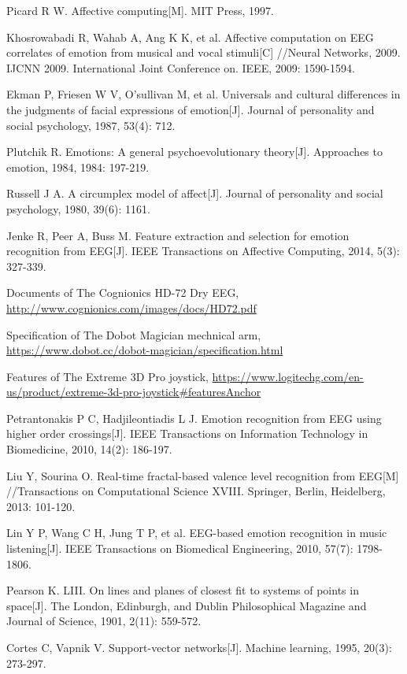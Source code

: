 \documentclass[runningheads,a4paper]{llncs}
\begin{document}
\begin{thebibliography}{4}

 Picard R W.
  Affective computing[M].
   MIT Press, 1997.

 Khosrowabadi R, Wahab A, Ang K K, et al.
Affective computation on EEG correlates of emotion from musical and vocal stimuli[C]
//Neural Networks, 2009. IJCNN 2009. International Joint Conference on. IEEE, 2009: 1590-1594.

 Ekman P, Friesen W V, O'sullivan M, et al.
Universals and cultural differences in the judgments of facial expressions of emotion[J].
Journal of personality and social psychology, 1987, 53(4): 712.

 Plutchik R.
Emotions: A general psychoevolutionary theory[J].
Approaches to emotion, 1984, 1984: 197-219.

 Russell J A.
A circumplex model of affect[J].
Journal of personality and social psychology, 1980, 39(6): 1161.

 Jenke R, Peer A, Buss M.
Feature extraction and selection for emotion recognition from EEG[J].
IEEE Transactions on Affective Computing, 2014, 5(3): 327-339.

 Documents of The Cognionics HD-72 Dry EEG,
\url{http://www.cognionics.com/images/docs/HD72.pdf}

 Specification of The Dobot Magician mechnical arm,
\url{https://www.dobot.cc/dobot-magician/specification.html}

 Features of The Extreme 3D Pro joystick,
\url{https://www.logitechg.com/en-us/product/extreme-3d-pro-joystick#featuresAnchor}

 Petrantonakis P C, Hadjileontiadis L J.
Emotion recognition from EEG using higher order crossings[J].
IEEE Transactions on Information Technology in Biomedicine, 2010, 14(2): 186-197.

 Liu Y, Sourina O.
Real-time fractal-based valence level recognition from EEG[M]
//Transactions on Computational Science XVIII. Springer, Berlin, Heidelberg, 2013: 101-120.

 Lin Y P, Wang C H, Jung T P, et al.
 EEG-based emotion recognition in music listening[J].
 IEEE Transactions on Biomedical Engineering, 2010, 57(7): 1798-1806.

  Pearson K. LIII.
 On lines and planes of closest fit to systems of points in space[J].
 The London, Edinburgh, and Dublin Philosophical Magazine and Journal of Science, 1901, 2(11): 559-572.

 Cortes C, Vapnik V.
Support-vector networks[J].
Machine learning, 1995, 20(3): 273-297.

\end{thebibliography}
\end{document}
